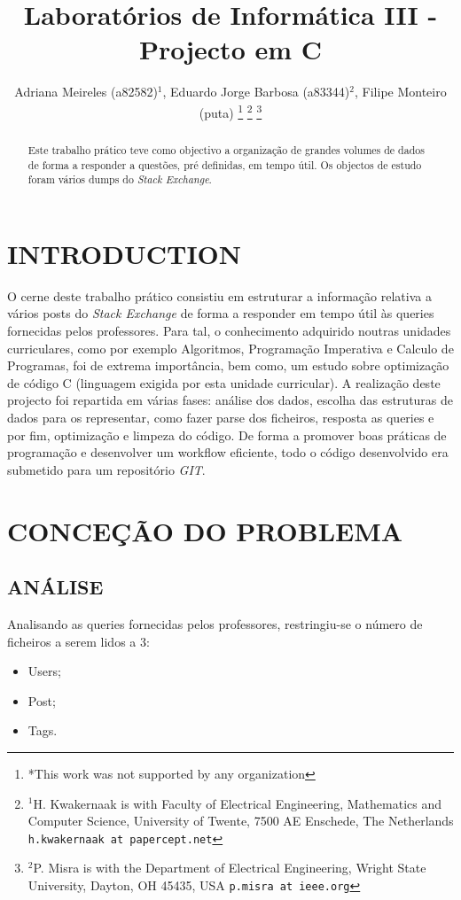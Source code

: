 \documentclass[letterpaper, 10 pt, conference]{IEEEtran}  %
\title{\LARGE \bf
Laboratórios de Informática III - Projecto em C
}
\author{Adriana Meireles (a82582)$^{1}$, Eduardo Jorge Barbosa (a83344)$^{2}$, Filipe Monteiro (puta)%
\thanks{*This work was not supported by any organization}%
\thanks{$^{1}$H. Kwakernaak is with Faculty of Electrical Engineering, Mathematics and Computer Science,
        University of Twente, 7500 AE Enschede, The Netherlands
        {\tt\small h.kwakernaak at papercept.net}}%
\thanks{$^{2}$P. Misra is with the Department of Electrical Engineering, Wright State University,
        Dayton, OH 45435, USA
        {\tt\small p.misra at ieee.org}}%
}
\begin{document}
\maketitle
\thispagestyle{empty}
\pagestyle{empty}


\begin{abstract}

Este trabalho prático teve como objectivo a organização de grandes volumes de dados de forma a responder a questões, pré definidas, em tempo útil. Os objectos de estudo foram vários dumps do \textit{Stack Exchange}.

\end{abstract}


\section{INTRODUCTION}

O cerne deste trabalho prático consistiu em estruturar a informação relativa a vários posts do \textit{Stack Exchange} de forma a responder em tempo útil às queries fornecidas pelos professores. Para tal, o conhecimento adquirido noutras unidades curriculares, como por exemplo Algoritmos, Programação Imperativa e Calculo de Programas, foi de extrema importância, bem como, um estudo sobre optimização de código C (linguagem exigida por esta unidade curricular). A realização deste projecto foi repartida em várias fases: análise dos dados, escolha das estruturas de dados para os representar, como fazer parse dos ficheiros, resposta as queries e por fim, optimização e limpeza do código. De forma a promover boas práticas de programação e desenvolver um workflow eficiente, todo o código desenvolvido era submetido para um repositório \textit{GIT}.

\section{CONCEÇÃO DO PROBLEMA}

\subsection{ANÁLISE}

Analisando as queries fornecidas pelos professores, restringiu-se o número de ficheiros a serem lidos a 3:

\begin{itemize}
\item Users;
\item Post;
\item Tags.
\end{itemize}
\end{document}
